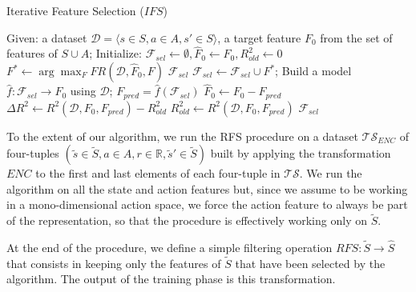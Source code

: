 \begin{algorithm}
    \caption{Iterative Feature Selection ($IFS$)}
    \label{alg:IFS}
    \begin{algorithmic}
	\STATE Given: a dataset $\mathcal{D} = {\langle s \in S, a \in A, s' \in S \rangle}$, a target feature $F_0$ from the set of features of $S \cup A$;
	\STATE Initialize: $\mathcal{F}_{sel} \leftarrow \emptyset, \hat{F}_0 \leftarrow F_0, R^2_{old} \leftarrow 0$
	\REPEAT
	    \STATE $F^* \leftarrow \arg\max_F FR(\mathcal{D}, \hat{F}_0, F)$
		\RETURN $\mathcal{F}_{sel}$
	    \ENDIF
	    \STATE $\mathcal{F}_{sel} \leftarrow \mathcal{F}_{sel} \cup F^*$;
	    \STATE Build a model $\hat{f}: \mathcal{F}_{sel} \rightarrow F_0$ using $\mathcal{D}$;
	    \STATE $F_{pred} = \hat{f}(\mathcal{F}_{sel})$
	    \STATE $\hat{F}_0 \leftarrow F_0 - F_{pred}$
	    \STATE $\Delta R^2 \leftarrow R^2(\mathcal{D}, F_0, F_{pred}) - R^2_{old}$
	    \STATE $R^2_{old} \leftarrow R^2 (\mathcal{D}, F_0, F_{pred})$
	\RETURN $\mathcal{F}_{sel}$	
    \end{algorithmic}
\end{algorithm}
%

To the extent of our algorithm, we run the RFS procedure on a dataset 
$\mathcal{TS}_{ENC}$ of four-tuples 
$(\tilde{s} \in \tilde{S}, a \in A, r \in \mathbb{R}, \tilde{s}' \in \tilde{S})$
built by applying the transformation $ENC$ to the first and last elements of 
each four-tuple in $\mathcal{TS}$.
We run the algorithm on all the state and action features but, since we 
assume to be working in a mono-dimensional action space, we force the action 
feature to always be part of the representation, so that the procedure is 
effectively working only on $\tilde{S}$.

At the end of the procedure, we define a simple filtering operation 
$RFS: \tilde{S} \rightarrow \hat{S}$ that consists in keeping only the features
of $\tilde{S}$ that have been selected by the algorithm. The output of the 
training phase is this transformation. 


